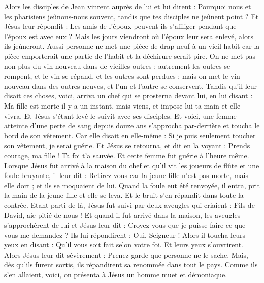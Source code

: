 \begin{multicols}{2}
Alors les disciples de Jean vinrent auprès de lui et lui dirent : Pourquoi nous et les pharisiens jeûnons-nous souvent, tandis que tes disciples ne jeûnent point ?
Et Jésus leur répondit : Les amis de l'époux peuvent-ils s'affliger pendant que l'époux est avec eux ? Mais les jours viendront où l'époux leur sera enlevé, alors ils jeûneront.
Aussi personne ne met une pièce de drap neuf à un vieil habit car la pièce emporterait une partie de l'habit et la déchirure serait pire.
On ne met pas non plus du vin nouveau dans de vieilles outres ; autrement les outres se rompent, et le vin se répand, et les outres sont perdues ; mais on met le vin nouveau dans des outres neuves, et l'un et l'autre se conservent.
Tandis qu'il leur disait ces choses, voici, arriva un chef qui se prosterna devant lui, en lui disant : Ma fille est morte il y a un instant, mais viens, et impose-lui ta main et elle vivra.
Et Jésus s'étant levé le suivit avec ses disciples.
Et voici, une femme atteinte d'une perte de sang depuis douze ans s'approcha par-derrière et toucha le bord de son vêtement.
Car elle disait en elle-même : Si je puis seulement toucher son vêtement, je serai guérie.
Et Jésus se retourna, et dit en la voyant : Prends courage, ma fille ! Ta foi t'a sauvée. Et cette femme fut guérie à l'heure même.
Lorsque Jésus fut arrivé à la maison du chef et qu'il vit les joueurs de flûte et une foule bruyante,
il leur dit : Retirez-vous car la jeune fille n'est pas morte, mais elle dort ; et ils se moquaient de lui.
Quand la foule eut été renvoyée, il entra, prit la main de la jeune fille et elle se leva.
Et le bruit s'en répandit dans toute la contrée.
Etant parti de là, Jésus fut suivi par deux aveugles qui criaient : Fils de David, aie pitié de nous !
Et quand il fut arrivé dans la maison, les aveugles s'approchèrent de lui et Jésus leur dit : Croyez-vous que je puisse faire ce que vous me demandez ? Ils lui répondirent : Oui, Seigneur !
Alors il toucha leurs yeux en disant : Qu'il vous soit fait selon votre foi.
Et leurs yeux s'ouvrirent. Alors Jésus leur dit sévèrement : Prenez garde que personne ne le sache.
Mais, dès qu'ils furent sortis, ils répandirent sa renommée dans tout le pays.
Comme ils s'en allaient, voici, on présenta à Jésus un homme muet et démoniaque.

\end{multicols}
